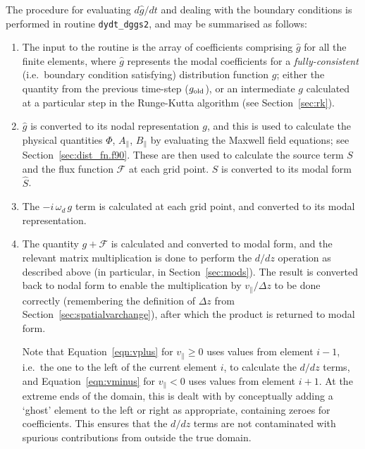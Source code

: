 \documentclass[10pt,a4paper]{article}
\begin{document}
The procedure for evaluating $d\hat{g}/dt$ and dealing with the boundary
conditions is performed in routine \texttt{dydt\_dggs2}, and may be summarised
as follows:
\begin{enumerate}

\item The input to the routine is the array of coefficients comprising
  $\hat{g}$ for all the finite elements, where $\hat{g}$ represents the modal
  coefficients for a \textit{fully-consistent}\/ (i.e.\ boundary condition
  satisfying) distribution function $g$; either the quantity from the previous
  time-step ($g_{\mbox{\scriptsize old}}$), or an intermediate $g$ calculated
  at a particular step in the Runge-Kutta algorithm (see
  Section~\ref{sec:rk}).

\item $\hat{g}$ is converted to its nodal representation $g$, and this is used
  to calculate the physical quantities $\Phi$, $A_\parallel$, $B_\parallel$ by
  evaluating the Maxwell field equations; see
  Section~\ref{sec:dist_fn.f90}. These are then used to calculate the source
  term $S$ and the flux function $\mathcal{F}$ at each grid point. $S$ is
  converted to its modal form $\hat{S}$.

\item The $-i\, \omega_d \,g$ term is calculated at each grid point, and
  converted to its modal representation.

\item The quantity $g+\mathcal{F}$ is calculated and converted to modal form,
  and the relevant matrix multiplication is done to perform the $d/dz$
  operation as described above (in particular, in Section~\ref{sec:mods}). The
  result is converted back to nodal form to enable the multiplication by
  $v_\parallel/\Delta z$ to be done correctly (remembering the definition of
  $\Delta z$ from Section~\ref{sec:spatialvarchange}), after which the product
  is returned to modal form.

  Note that Equation~\ref{eqn:vplus} for $v_\parallel \geq 0$ uses values from
  element $i-1$, i.e.\ the one to the left of the current element $i$, to
  calculate the $d/dz$ terms, and Equation~\ref{eqn:vminus} for $v_\parallel <
  0$ uses values from element $i+1$. At the extreme ends of the domain, this
  is dealt with by conceptually adding a `ghost' element to the left or right
  as appropriate, containing zeroes for coefficients. This ensures that the
  $d/dz$ terms are not contaminated with spurious contributions from outside
  the true domain.


\end{enumerate}
\end{document}

